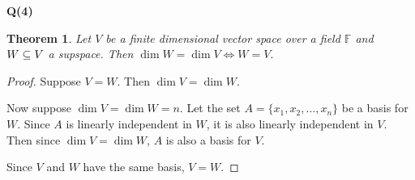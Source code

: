 \documentclass[12pt, a4paper]{article}
\newtheorem*{theorem}{Theorem}
\newcommand{\F}{\mathbb{F}}
\begin{document}
\textbf{Q(4)}
\begin{theorem}
    Let $V$ be a finite dimensional vector space over a field $\F$ and
    $W \subseteq V$ a supspace. Then $\dim W = \dim V \iff W = V.$
\end{theorem}

\begin{proof}
    Suppose $V = W$. Then $\dim V = \dim W$.

    Now suppose $\dim V = \dim W = n$. Let the set
    $A = \{x_1, x_2, \ldots, x_n\}$ be a basis for $W$.
    Since $A$ is linearly independent in $W$, it is also
    linearly independent in $V$.
    Then since $\dim V = \dim W$, $A$ is also a basis for $V$.

    Since $V$ and $W$ have the same basis, $V = W$.
\end{proof}
\end{document}
